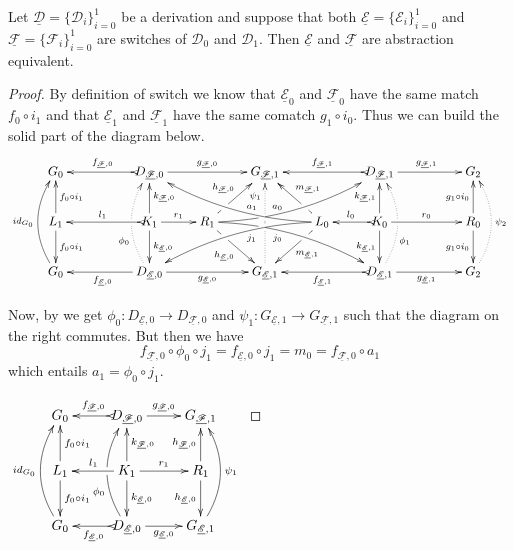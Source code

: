 \documentclass[a4paper,UKenglish,cleveref,pdftex,thm-restate,numberwithinsect,anonymous]{lipics}
\newcommand{\id}[1]{\mathsf{id}_{#1}}
\newcommand{\dder}[1]{\mathscr{#1}}
\newcommand{\der}[1]{\underline{\dder{#1}}}
\begin{document}
\begin{lemma}
  \label{thm:switch_uni}
  Let $\der{D}=\{\dder{D}_{i}\}_{i=0}^1$ be a derivation and suppose
  that both $\der{E}=\{\dder{E}_i\}_{i=0}^1$ and
  $\der{F}=\{\dder{F}_i\}_{i=0}^1$ are switches of $\dder{D}_0$ and
  $\dder{D}_1$. Then $\der{E}$ and $\der{F}$ are abstraction
  equivalent.
\end{lemma}

\begin{proof}
    By definition of switch we know that $\der{E}_0$ and $\der{F}_0$ have the same match $f_0\circ i_1$ and that $\der{E}_1$ and $\der{F}_1$ have the same comatch $g_1\circ i_0$. Thus we can build the solid part of the diagram below.
    \[\xymatrix@C=22pt{G_{0} && \ar@{>->}[ll]_{f_{\der{F},0}} D_{\der{F},0} \ar[rr]^{g_{\der{F},0}}&& G_{\der{F},1} && \ar@{>->}[ll]_{f_{\der{F},1}} D_{\der{F},1} \ar[rr]^{g_{\der{F},1}}&& G_{2}\\L_1 \ar[d]^{f_0\circ i_1} \ar[u]_{f_0\circ i_1}&& K_{1} \ar[d]^{k_{\der{E},0}} \ar[u]_{k_{\der{F},0}}\ar@{>->}[ll]_{l_1} \ar[r]^{r_1} & R_{1} \ar@/^.35cm/[drrr]|(.3)\hole_(.4){j_0} \ar[dr]|(.3)\hole_{h_{\der{E},0}} \ar@/_.35cm/[urrr]|(.3)\hole^(.4){a_0} \ar[ur]|(.3)\hole^{h_{\der{F},0}}& &L_{0} \ar@/_.35cm/[dlll]^(.4){j_1} \ar[dl]|(.3)\hole^{m_{\der{E},1}} \ar@/^.35cm/[ulll]_(.4){a_1} \ar[ul]|(.3)\hole_{m_{\der{F},1}}& K_{0} \ar[d]_{k_{\der{E},1}} \ar[u]^{k_{\der{F},1}}\ar@{>->}[l]_{l_{0}} \ar[rr]^{r_0} && R_{0} \ar[d]_{g_1\circ i_0} \ar[u]^{g_1\circ i_0}\\ \ar@/^.5cm/[uu]^{\id{G_0}} G_{0} && \ar[ll]^{f_{\der{E},0}} D_{\der{E},0} \ar@{.>}@/^.5cm/[uu]^(.33){\phi_{0}}|\hole \ar[rr]_{g_{\der{E},0}}&& G_{\der{E},1} \ar@{.>}[uu]^(.76){\psi_1}|(.45)\hole |(.55)\hole&& \ar@{>->}[ll]^{f_{\der{E},1}} D_{\der{E},1} \ar@{.>}@/_.5cm/[uu]_(.33){\phi_{1}}|\hole\ar[rr]_{g_{\der{E},1}}&& G_{2}\ar@{.>}@/_.5cm/[uu]_{\psi_2}}\]
    
    \parbox{7cm}{\hspace{15pt}Now, by  we get $\phi_0\colon D_{\der{E},0}\to D_{\der{F},0}$ and $\psi_1 \colon G_{\der{E},1}\to G_{\der{F},1}$ such that the diagram on the right commutes. But then we have
    	\[
    	f_{\der{F},0}\circ \phi_0\circ j_1=f_{\der{E},0} \circ j_1=m_0=f_{\der{F},0}\circ a_1\]
    	which entails $a_1= \phi_0\circ j_1$.}
\parbox{4cm} {$\xymatrix{G_{0} & \ar@{>->}[l]_{f_{\der{F},0}} D_{\der{F},0} \ar[r]^{g_{\der{F},0}}& G_{\der{F},1} \\L_1 \ar[d]^{f_0\circ i_1} \ar[u]_{f_0\circ i_1}& K_{1} \ar[d]^{k_{\der{E},0}} \ar[u]_{k_{\der{F},0}}\ar[l]_{l_1} \ar[r]^{r_1} & R_{1}  \ar[d]_{h_{\der{E},0}}  \ar[u]^{h_{\der{F},0}}\\ \ar@/^.5cm/[uu]^{\id{G_0}} G_{0} & \ar@{>->}[l]^{f_{\der{E},0}} D_{\der{E},0} \ar@/^.5cm/[uu]^(.33){\phi_{0}}|\hole \ar[r]_{g_{\der{E},0}}& G_{\der{E},1} \ar@/_.5cm/[uu]_{\psi_1}}$}
    

\end{proof}
\end{document}
